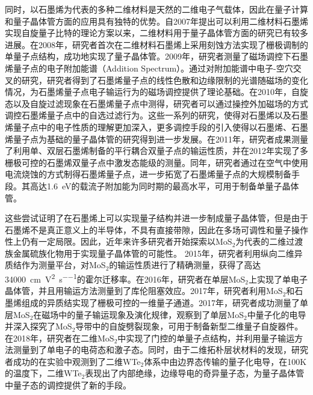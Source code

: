     同时，以石墨烯为代表的多种二维材料是天然的二维电子气载体，因此在量子计算和量子晶体管方面的应用具有独特的优势。自2007年提出可以利用二维材料石墨烯实现自旋量子比特的理论方案以来，二维材料用于量子晶体管方面的研究已有较多进展。在2008年，研究者首次在二维材料石墨烯上采用刻蚀方法实现了栅极调制的单量子点结构，成功地实现了量子晶体管。2009年，研究者测量了磁场调控下石墨烯量子点的电子附加能谱（Addition Spectrum）。通过对附加能谱中电子-空穴交叉的研究，研究者得到了石墨烯量子点的线性色散和边缘限制的光谱随磁场的变化情况，为石墨烯量子点电子输运行为的磁场调控提供了理论基础。在2010年，自旋态以及自旋过滤现象在石墨烯量子点中测得，研究者可以通过操控外加磁场的方式调控石墨烯量子点中的自选过滤行为。这些一系列的研究，使得对石墨烯以及石墨烯量子点中的电子性质的理解更加深入，更多调控手段的引入使得以石墨烯、石墨烯量子点为基础的量子晶体管的研究得到进一步发展。在2011年，研究者成果测量了利用单、双层石墨烯制备的平行耦合双量子点的输运性质，并在2012年实现了多栅极可控的石墨烯双量子点中激发态能级的测量。同年，研究者通过在空气中使用电流烧蚀的方式制得石墨烯量子点，进一步拓宽了石墨烯量子点的大规模制备手段。其高达\SI{1.6}{\electronvolt}的载流子附加能为同时期的最高水平，可用于制备单量子晶体管。

    这些尝试证明了在石墨烯上可以实现量子结构并进一步制成量子晶体管，但是由于石墨烯不是真正意义上的半导体，不具有直接带隙，因此在多场可调性和量子操作性上仍有一定局限。因此，近年来许多研究者开始探索以MoS$_2$为代表的二维过渡族金属硫族化物用于实现量子晶体管的可能性。
    2015年，研究者利用纵向二维异质结作为测量平台，对MoS$_2$的输运性质进行了精确测量，获得了高达\SI{34000}{\centi\meter\per\volt\squared\per\second}的霍尔迁移率。在2016年，研究者在单层MoS$_2$上实现了单电子晶体管，并且用输运方法测量到了库伦阻塞效应。2017年，研究者利用MoS$_2$和石墨烯组成的异质结实现了栅极可控的一维量子通道。2017年，研究者成功测量了单层MoS$_2$在磁场中的量子输运现象及演化规律，观察到了单层MoS$_2$中量子化的电导并深入探究了MoS$_2$导带中的自旋劈裂现象，可用于制备新型二维量子自旋器件。在2018年，研究者在二维MoS$_2$中实现了门控的单量子点结构，并利用量子输运方法测量到了单电子的电荷态和激子态。同时，由于二维拓朴层状材料的发现，研究者成功的在实验中观测到了二维WTe$_2$体系中由边界态传输的量子化电导，在100K的温度下，二维WTe$_2$表现出了内部绝缘，边缘导电的奇异量子态，为量子晶体管中量子态的调控提供了新的手段。

